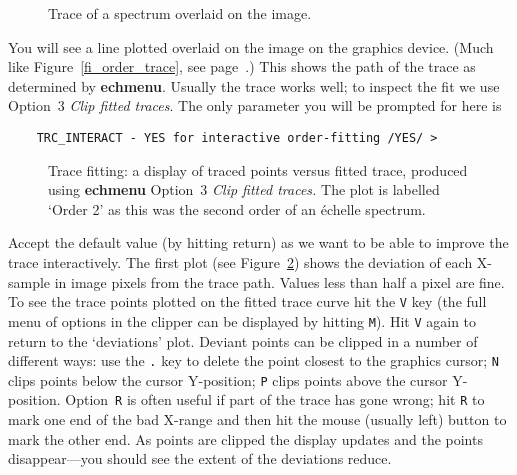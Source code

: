 \documentclass[twoside,11pt]{article}
\newcommand{\xref}[3]{#1}
\newcommand{\scspec}[2]{#1}
\newcommand{\scspec}[2]{#2}
\begin{document}
\begin{htmlonly}
\begin{figure}
\begin{center}
  \leavevmode\epsfysize=136mm
  \parbox{140mm}{
    \caption{Trace of a spectrum overlaid on the image.}
    \label{fi_order_trace_again}
  }
\end{center}
\end{figure}
\end{htmlonly}

You will see a line plotted overlaid on the image on the graphics device.
\scspec{(Much like Figure~\ref{fi_order_trace}, see
page~\pageref{fi_order_trace}.)}{(Similar to the plot above.)}
This shows the path of the trace as determined by
\xref{{\bf echmenu}}{sun152}{ECHMENU}\@.
Usually the trace works well; to inspect the fit we use
\xref{Option~3 {\sl Clip fitted traces}}{sun152}{option3}.
The only parameter you will be prompted for here is

{
\scspec{\small}{ }
\begin{verbatim}
    TRC_INTERACT - YES for interactive order-fitting /YES/ >
\end{verbatim}
}

\begin{figure}
\begin{center}
  \scspec{\leavevmode\epsfysize=100mm\epsfbox{sc7_11.eps}}
         {\leavevmode\epsfysize=136mm}

  \parbox{140mm}{
  \caption{Trace fitting: a display of traced points versus fitted trace,
           produced using {\bf echmenu} Option~3 {\sl Clip fitted
	   traces.} The plot is labelled `Order 2' as this was the
	   second order of an \'{e}chelle spectrum.}
    \label{fi_trace_fit}
  }
\end{center}
\end{figure}

Accept the default value (by hitting return) as we want to be able to
improve the trace interactively.
The first plot (see \scspec{Figure~\ref{fi_trace_fit}}
{the figure above}) shows the deviation of each X-sample in image
pixels from the trace path.
Values less than half a pixel are fine.  To see the
trace points plotted on the fitted trace curve hit the \verb+V+ key (the
full menu of options in the clipper can be displayed by hitting \verb+M+).
Hit \verb+V+ again to return to the `deviations' plot.  Deviant points can
be clipped in a number of different ways: use the \verb+.+ key to delete
the point closest to the graphics cursor; \verb+N+ clips points below the
cursor Y-position; \verb+P+ clips points above the cursor Y-position.
Option~\verb+R+ is often useful if part of the trace has gone wrong;
hit \verb+R+ to mark one end of the bad X-range and then hit the mouse
(usually left) button to mark the other end.
As points are clipped the display updates and the points
disappear\scspec{---}{ - }you should see the extent of the
deviations reduce.
\end{document}

